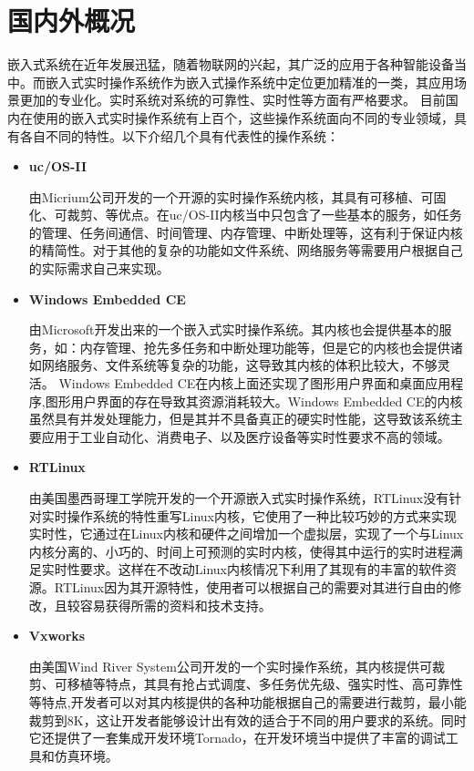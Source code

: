 \section{国内外概况}
	嵌入式系统在近年发展迅猛，随着物联网的兴起，其广泛的应用于各种智能设备当中。而嵌入式实时操作系统作为嵌入式操作系统中定位更加精准的一类，其应用场景更加的专业化\cite{解月江2004VxWorks设备驱动技术研究}\cite{VxWorks嵌入式实时操作系统的结构研究}。实时系统对系统的可靠性、实时性等方面有严格要求。
	目前国内在使用的嵌入式实时操作系统有上百个，这些操作系统面向不同的专业领域，具有各自不同的特性。以下介绍几个具有代表性的操作系统：
\begin{itemize}
\item \textbf{uc/OS-II}
	
	由Micrium公司开发的一个开源的实时操作系统内核，其具有可移植、可固化、可裁剪、等优点\cite{Wu2008Implementation}。在uc/OS-II内核当中只包含了一些基本的服务，如任务的管理、任务间通信、时间管理、内存管理、中断处理等\cite{马增炜2011基于}\cite{Zhang2010Design}，这有利于保证内核的精简性。对于其他的复杂的功能如文件系统、网络服务等需要用户根据自己的实际需求自己来实现。
	
	
\item \textbf{Windows Embedded CE}

	由Microsoft开发出来的一个嵌入式实时操作系统。其内核也会提供基本的服务，如：内存管理、抢先多任务和中断处理功能等，但是它的内核也会提供诸如网络服务、文件系统等复杂的功能，这导致其内核的体积比较大，不够灵活。
	Windows Embedded CE在内核上面还实现了图形用户界面和桌面应用程序,图形用户界面的存在导致其资源消耗较大\cite{徐媛媛2003嵌入式实时操作系统的设备驱动}\cite{谢强2007基于}。Windows Embedded CE的内核虽然具有并发处理能力，但是其并不具备真正的硬实时性能，这导致该系统主要应用于工业自动化、消费电子、以及医疗设备等实时性要求不高的领域。
	
\item \textbf{RTLinux}
	
	由美国墨西哥理工学院开发的一个开源嵌入式实时操作系统，RTLinux没有针对实时操作系统的特性重写Linux内核，它使用了一种比较巧妙的方式来实现实时性，它通过在Linux内核和硬件之间增加一个虚拟层，实现了一个与Linux内核分离的、小巧的、时间上可预测的实时内核，使得其中运行的实时进程满足实时性要求\cite{郭春生2002硬实时操作系统}。这样在不改动Linux内核情况下利用了其现有的丰富的软件资源\cite{Zhu2004RTLinux}。RTLinux因为其开源特性，使用者可以根据自己的需要对其进行自由的修改，且较容易获得所需的资料和技术支持。
	
\item \textbf{Vxworks}

	由美国Wind River System公司开发的一个实时操作系统，其内核提供可裁剪、可移植等特点，其具有抢占式调度、多任务优先级、强实时性、高可靠性等特点\cite{李立志2003实时操作系统}\cite{陈洋2007VxWorks},开发者可以对其内核提供的各种功能根据自己的需要进行裁剪，最小能裁剪到8K，这让开发者能够设计出有效的适合于不同的用户要求的系统\cite{谢强2007基于}\cite{徐媛媛2003嵌入式实时操作系统的设备驱动}。同时它还提供了一套集成开发环境Tornado，在开发环境当中提供了丰富的调试工具和仿真环境。	
\end{itemize}	
		

